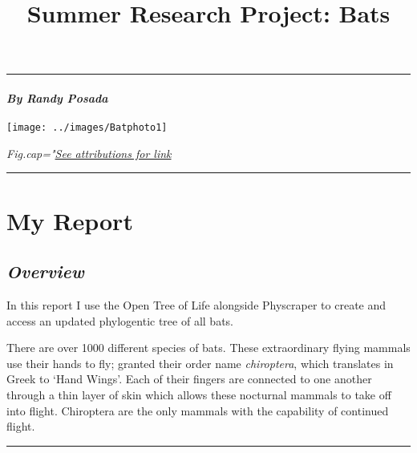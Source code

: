 \documentclass[]{article}
\title{Summer Research Project: Bats}
\author{}
\date{\vspace{-2.5em}}
\let\oldparagraph\paragraph
\renewcommand{\paragraph}[1]{\oldparagraph{#1}\mbox{}}
\begin{document}
\maketitle

\begin{center}\rule{0.5\linewidth}{0.5pt}\end{center}

\hypertarget{by-randy-posada}{%
\paragraph{\texorpdfstring{\emph{By Randy
Posada}}{By Randy Posada}}\label{by-randy-posada}}

\begin{center}\texttt{[image: ../images/Batphoto1]} \end{center}

\emph{Fig.cap="\protect\hyperlink{Attributions}{See attributions for
link}}

\begin{center}\rule{0.5\linewidth}{0.5pt}\end{center}

\hypertarget{my-report}{%
\section{\texorpdfstring{\textbf{My
Report}}{My Report}}\label{my-report}}

\hypertarget{overview}{%
\subsection{\texorpdfstring{\emph{Overview}}{Overview}}\label{overview}}

In this report I use the Open Tree of Life alongside Physcraper to
create and access an updated phylogentic tree of all bats.

There are over 1000 different species of bats. These extraordinary
flying mammals use their hands to fly; granted their order name
\emph{chiroptera}, which translates in Greek to `Hand Wings'. Each of
their fingers are connected to one another through a thin layer of skin
which allows these nocturnal mammals to take off into flight. Chiroptera
are the only mammals with the capability of continued flight.

\begin{center}\rule{0.5\linewidth}{0.5pt}\end{center}
\end{document}
